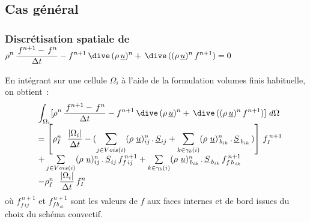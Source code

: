 \subsection*{Cas général}


\subsubsection* {Discrétisation spatiale de $ \displaystyle \rho^n \,\frac {\,f^{n+1} -\,f^n}{\Delta t} -
f^{n+1}\,\dive\,(\rho\,\underline{u})^n +
\,\dive\,((\rho\,\underline{u})^n\,f^{n+1}) = 0$}

En intégrant sur une cellule $\Omega_i$ à l'aide de la formulation volumes
finis habituelle, on obtient~:
\begin{equation}
\begin{array}{lll}
&\displaystyle\int_{\Omega_i}[\displaystyle \rho^n \,\frac {\,f^{n+1} -\,f^n}{\Delta t} -
f^{n+1}\,\dive\,(\rho\,\underline{u})^n +
\,\dive\,((\rho\,\underline{u})^n\,f^{n+1})]\ d\Omega \\
&= \left[\rho_I^n\ \displaystyle\ \frac{|\Omega_i|}{\Delta t}  -
(\sum\limits_{j\in Vois(i)}(\rho\
\underline{u})^{n}_{ij}\,.\,\underline{S}_{ij} + \sum\limits_{k\in
{\gamma_b(i)}}(\rho\
\underline{u})^{n}_{\,b_{ik}}\,.\,\underline{S}_{\,b_{ik}}\,)\right]\, f_I^{\,n+1} \\
&+\sum\limits_{j\in Vois(i)} (\rho\
\underline{u})^{n}_{ij}\,.\,\underline{S}_{ij}\,
f^{\,n+1}_{f\,ij}+\sum\limits_{k\in {\gamma_b(i)}} (\rho\
\underline{u})^{n}_{\,b_{ik}}\,.\,\underline{S}_{\,b_{ik}}\,f^{\,n+1}_{f\,{b_{\,ik}}}
\\
&-\rho_I^n\ \displaystyle\ \frac{|\Omega_i|}{\Delta t}\,f_I^n \\
\end{array}
\end{equation}
où $f^{\,n+1}_{f\,ij}$ et $f^{\,n+1}_{f\,{b_{\,ik}}}$ sont les valeurs de $f$
aux faces internes et de bord issues du choix du schéma convectif.

